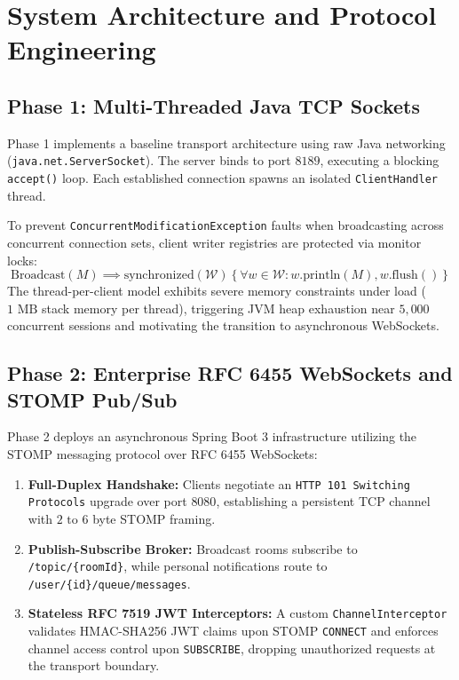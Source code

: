 \documentclass[conference]{IEEEtran}
\begin{document}
\section{System Architecture and Protocol Engineering}

\subsection{Phase 1: Multi-Threaded Java TCP Sockets}
Phase 1 implements a baseline transport architecture using raw Java networking (\texttt{java.net.ServerSocket}). The server binds to port $8189$, executing a blocking \texttt{accept()} loop. Each established connection spawns an isolated \texttt{ClientHandler} thread.

To prevent \texttt{ConcurrentModificationException} faults when broadcasting across concurrent connection sets, client writer registries are protected via monitor locks:
\begin{equation}
    \text{Broadcast}(M) \implies \text{synchronized}(\mathcal{W}) \left\{ \forall w \in \mathcal{W}: w.\text{println}(M), w.\text{flush}() \right\}
\end{equation}
The thread-per-client model exhibits severe memory constraints under load ($1\text{ MB}$ stack memory per thread), triggering JVM heap exhaustion near $5{,}000$ concurrent sessions and motivating the transition to asynchronous WebSockets.

\subsection{Phase 2: Enterprise RFC 6455 WebSockets and STOMP Pub/Sub}
Phase 2 deploys an asynchronous Spring Boot 3 infrastructure utilizing the STOMP messaging protocol over RFC 6455 WebSockets:
\begin{enumerate}
    \item \textbf{Full-Duplex Handshake:} Clients negotiate an \texttt{HTTP 101 Switching Protocols} upgrade over port $8080$, establishing a persistent TCP channel with $2\text{ to }6$ byte STOMP framing.
    \item \textbf{Publish-Subscribe Broker:} Broadcast rooms subscribe to \texttt{/topic/\{roomId\}}, while personal notifications route to \texttt{/user/\{id\}/queue/messages}.
    \item \textbf{Stateless RFC 7519 JWT Interceptors:} A custom \texttt{ChannelInterceptor} validates HMAC-SHA256 JWT claims upon STOMP \texttt{CONNECT} and enforces channel access control upon \texttt{SUBSCRIBE}, dropping unauthorized requests at the transport boundary.
\end{enumerate}
\end{document}
